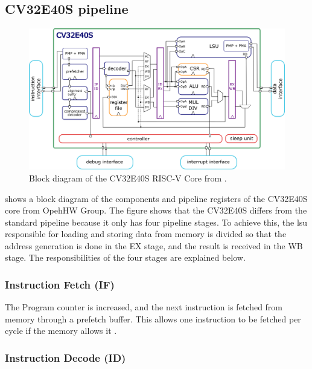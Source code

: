 \subsection{CV32E40S pipeline}
\label{sec:bg_cv32Pipeline}


\begin{figure}[htb]
    \centering
    \includegraphics[width=\linewidth]{figures/CV32E40S_Block_Diagram.png}
    \caption{Block diagram of the CV32E40S RISC-V Core from \cite{openhwgroupIntroductionCOREVCV32E40S2023}.}
    \label{fig:cv32e40s-block}
\end{figure}

 shows a block diagram of the components and pipeline registers of the CV32E40S core from OpehHW Group.
The figure shows that the CV32E40S differs from the standard pipeline because it only has four pipeline stages. To achieve this, the \acrlong{lsu} responsible for loading and storing data from memory is divided so that the address generation is done in the EX stage, and the result is received in the WB stage.
The responsibilities of the four stages are explained below.

\subsubsection{Instruction Fetch (IF)}

The Program counter is increased, and the next instruction is fetched from memory through a prefetch buffer. This allows one instruction to be fetched per cycle if the memory allows it \cite{openhwgroupPipelineDetails2023}.

\subsubsection{Instruction Decode (ID)}

